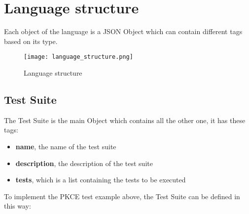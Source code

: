 

\section{Language structure}
Each object of the language is a JSON Object which can contain different tags based on its type.
\begin{figure}
    \texttt{[image: language\_structure.png]}
    \caption{Language structure}
    \label{fig:language_structure}
\end{figure}


\subsection{Test Suite}
The Test Suite is the main Object which contains all the other one, it has these tags:
\begin{itemize}
    \item \textbf{name}, the name of the test suite
    \item \textbf{description}, the description of the test suite
    \item \textbf{tests}, which is a list containing the tests to be executed
\end{itemize}
To implement the PKCE test example above, the Test Suite can be defined in this way:


